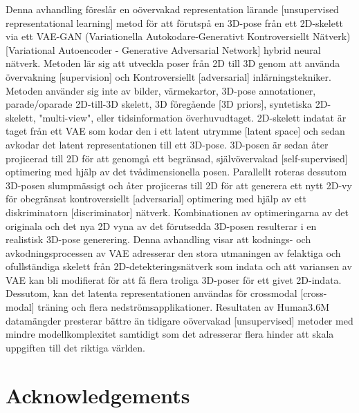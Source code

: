 Denna avhandling föreslår en oövervakad representation lärande [unsupervised representational learning] metod för att förutspå en 3D-pose från ett 2D-skelett via ett VAE-GAN (Variationella Autokodare-Generativt Kontroversiellt Nätverk)[Variational Autoencoder - Generative Adversarial Network] hybrid neural nätverk. Metoden lär sig att utveckla poser från 2D till 3D genom att använda övervakning [supervision] och Kontroversiellt [adversarial] inlärningstekniker. Metoden använder sig inte av bilder, värmekartor, 3D-pose annotationer, parade/oparade 2D-till-3D skelett, 3D föregående [3D priors], syntetiska 2D-skelett, "multi-view", eller tidsinformation överhuvudtaget. 2D-skelett indatat är taget från ett VAE som kodar den i ett latent utrymme [latent space] och sedan avkodar det latent representationen till ett 3D-pose. 3D-posen är sedan åter projicerad till 2D för att genomgå ett begränsad, självövervakad [self-supervised] optimering med hjälp av det tvådimensionella posen. Parallellt roteras dessutom 3D-posen slumpmässigt och åter projiceras till 2D för att generera ett nytt 2D-vy för obegränsat kontroversiellt [adversarial] optimering med hjälp av ett diskriminatorn [discriminator] nätverk. Kombinationen av optimeringarna av det originala och det nya 2D vyna av det förutsedda 3D-posen resulterar i en realistisk 3D-pose generering. Denna avhandling visar att kodnings- och avkodningsprocessen av VAE adresserar den stora utmaningen av felaktiga och ofullständiga skelett från 2D-detekteringsnätverk som indata och att variansen av VAE kan bli modifierat för att få flera troliga 3D-poser för ett givet 2D-indata. Dessutom, kan det latenta representationen användas för crossmodal [cross-modal] träning och flera nedströmsapplikationer. Resultaten av Human3.6M datamängder presterar bättre än tidigare oövervakad [unsupervised] metoder med mindre modellkomplexitet samtidigt som det adresserar flera hinder att skala uppgiften till det riktiga världen.


\newpage
\thispagestyle{plain}
\chapter*{Acknowledgements}

